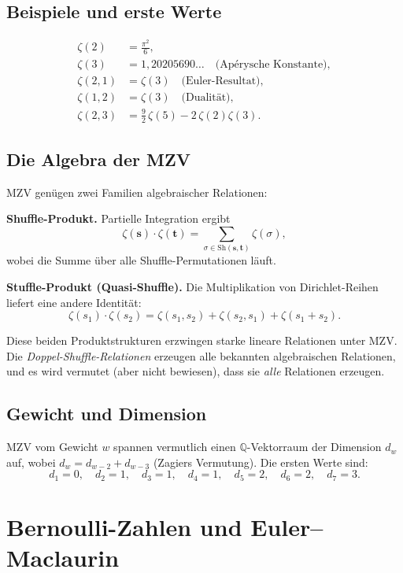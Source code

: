 \documentclass[12pt,a4paper]{amsart}
\theoremstyle{definition}
\theoremstyle{remark}
\begin{document}
\subsection{Beispiele und erste Werte}

\begin{align*}
  \zeta(2) &= \frac{\pi^2}{6}, \\
  \zeta(3) &= 1{,}20205690\ldots \quad \text{(Apérysche Konstante)}, \\
  \zeta(2, 1) &= \zeta(3) \quad \text{(Euler-Resultat)}, \\
  \zeta(1, 2) &= \zeta(3) \quad \text{(Dualität)}, \\
  \zeta(2, 3) &= \tfrac{9}{2}\,\zeta(5) - 2\,\zeta(2)\zeta(3).
\end{align*}

\subsection{Die Algebra der MZV}

MZV genügen zwei Familien algebraischer Relationen:

\textbf{Shuffle-Produkt.} Partielle Integration ergibt
\[
  \zeta(\mathbf{s}) \cdot \zeta(\mathbf{t}) = \sum_{\sigma \in
  \mathrm{Sh}(\mathbf{s}, \mathbf{t})} \zeta(\sigma),
\]
wobei die Summe über alle Shuffle-Permutationen läuft.

\textbf{Stuffle-Produkt (Quasi-Shuffle).} Die Multiplikation von Dirichlet-Reihen
liefert eine andere Identität:
\[
  \zeta(s_1) \cdot \zeta(s_2) = \zeta(s_1, s_2) + \zeta(s_2, s_1) +
  \zeta(s_1 + s_2).
\]

Diese beiden Produktstrukturen erzwingen starke lineare Relationen unter MZV.
Die \emph{Doppel-Shuffle-Relationen} erzeugen alle bekannten algebraischen
Relationen, und es wird vermutet (aber nicht bewiesen), dass sie
\emph{alle} Relationen erzeugen.

\subsection{Gewicht und Dimension}

MZV vom Gewicht $w$ spannen vermutlich einen $\mathbb{Q}$-Vektorraum der Dimension
$d_w$ auf, wobei $d_w = d_{w-2} + d_{w-3}$ (Zagiers Vermutung). Die ersten Werte
sind:
\[
  d_1 = 0,\quad d_2 = 1,\quad d_3 = 1,\quad d_4 = 1,\quad d_5 = 2,
  \quad d_6 = 2, \quad d_7 = 3.
\]

\section{Bernoulli-Zahlen und Euler--Maclaurin}
\end{document}
